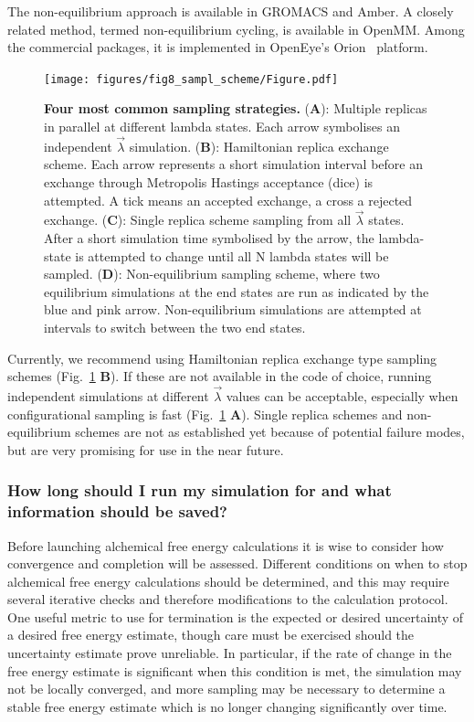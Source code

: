 \documentclass[9pt,bestpractices]{livecoms}
\begin{document}
The non-equilibrium approach is available in GROMACS and Amber. A closely related method, termed non-equilibrium cycling, is available in OpenMM. Among the commercial packages, it is implemented in OpenEye's Orion{\textregistered}~\cite{sorensen2024orion} platform.

\begin{figure}
    \texttt{[image: figures/fig8\_sampl\_scheme/Figure.pdf]}
    \caption{\textbf{Four most common sampling strategies.} (\textbf{A}): Multiple replicas in parallel at different lambda states. Each arrow symbolises an independent $\vec{\lambda}$ simulation. (\textbf{B}): Hamiltonian replica exchange scheme. Each arrow represents a short simulation interval before an exchange through Metropolis Hastings acceptance (dice) is attempted. A tick means an accepted exchange, a cross a rejected exchange. (\textbf{C}): Single replica scheme sampling from all $\vec{\lambda}$ states. After a short simulation time symbolised by the arrow, the lambda-state is attempted to change until all N lambda states will be sampled. (\textbf{D}): Non-equilibrium sampling scheme, where two equilibrium simulations at the end states are run as indicated by the blue and pink arrow. Non-equilibrium simulations are attempted at intervals to switch between the two end states.}
    \label{fig:fig_sampling_scheme}
\end{figure} 

Currently, we recommend using Hamiltonian replica exchange type sampling schemes (Fig.~\ref{fig:fig_sampling_scheme} \textbf{B}). If these are not available in the code of choice, running independent simulations at different $\vec{\lambda}$ values can be acceptable, especially when configurational sampling is fast (Fig.~\ref{fig:fig_sampling_scheme} \textbf{A}). Single replica schemes and non-equilibrium schemes are not as established yet because of potential failure modes, but are very promising for use in the near future. 


\subsubsection{How long should I run my simulation for and what information should be saved?}
\label{sec:sim_length_information_kept}
Before launching alchemical free energy calculations it is wise to consider how convergence and completion will be assessed. Different conditions on when to stop alchemical free energy calculations should be determined, and this may require several iterative checks and therefore modifications to the calculation protocol.
One useful metric to use for termination is the expected or desired uncertainty of a desired free energy estimate, though care must be exercised should the uncertainty estimate prove unreliable.
In particular, if the rate of change in the free energy estimate is significant when this condition is met, the simulation may not be locally converged, and more sampling may be necessary to determine a stable free energy estimate which is no longer changing significantly over time. 
\end{document}
